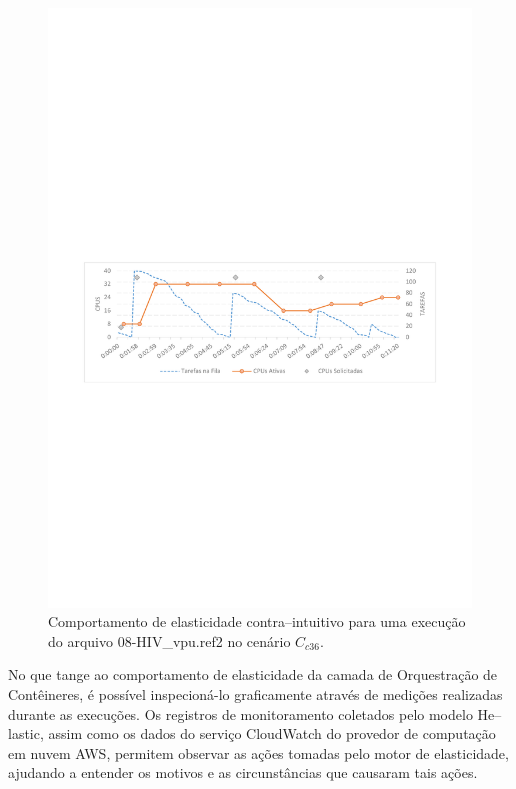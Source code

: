 \documentclass[english,brazilian]{UNISINOSmonografia} %
\begin{document}
\begin{figure}[p]
	\centering%
	\begin{minipage}{\textwidth}
		\caption{Comportamento de elasticidade contra--intuitivo para uma execução do arquivo 08-HIV\_vpu.ref2 no cenário $C_{c36}$.}
		\label{fig:results-modelo-batch-41HIV}
		\vspace{1ex}
		\includegraphics[trim=60 325 60 360,clip,width=\textwidth]{2018-12-16T11-41-09_HIV_vpu}
	\end{minipage}
\end{figure}


No que tange ao comportamento de elasticidade da camada de Orquestração de Contêineres, é possível inspecioná-lo graficamente através de medições realizadas durante as execuções.
%
Os registros de monitoramento coletados pelo modelo \textsf{He}--lastic, assim como os dados do serviço CloudWatch do provedor de computação em nuvem AWS, permitem observar as ações tomadas pelo motor de elasticidade, ajudando a entender os motivos e as circunstâncias que causaram tais ações.
\end{document}
